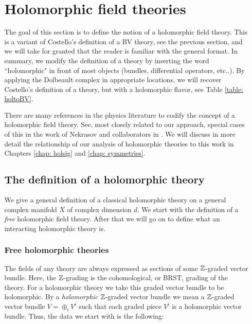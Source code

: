 
\section{Holomorphic field theories} \label{sec: hol theory}

The goal of this section is to define the notion of a holomorphic field theory. 
This is a variant of Costello's definition of a BV theory, see the previous section, and we will take for granted that the reader is familiar with the general format.
In summary, we modify the definition of a theory by inserting the word ``holomorphic" in front of most objects (bundles, differential operators, etc..).
By applying the Dolbeault complex in appropriate locations, we will recover Costello's definition of a theory, but with a holomorphic flavor, see Table \ref{table: holtoBV}. 

There are many references in the physics literature to codify the concept of a holomorphic field theory.
See, most closely related to our approach, special cases of this in the work of Nekrasov and collaborators in \cite{NekThesis, NekChiral, NekCFT}. 
We will discuss in more detail the relationship of our analysis of holomorphic theories to this work in Chapters \ref{chap: holsig} and \ref{chap: symmetries}. 

\subsection{The definition of a holomorphic theory}

We give a general definition of a classical holomorphic theory on a general complex manifold $X$ of complex dimension $d$.
We start with the definition of a {\em free} holomorphic field theory. 
After that we will go on to define what an interacting holomorphic theory is.

\subsubsection{Free holomorphic theories}

The fields of any theory are always expressed as sections of some $\mathbb Z$-graded vector bundle.
Here, the $\mathbb Z$-grading is the cohomological, or BRST, grading of the theory.
For a holomorphic theory we take this graded vector bundle to be holomorphic.  
By a {\em holomorphic} $\mathbb Z$-graded vector bundle we mean a $\mathbb Z$-graded vector bundle $
V = \oplus_i V^i$ such that each graded piece $V^i$ is a holomorphic vector bundle. 
Thus, the data we start with is the following:


